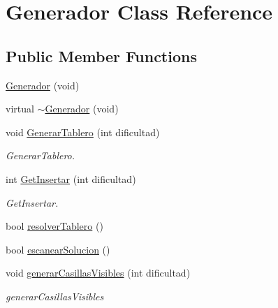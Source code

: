 \hypertarget{class_generador}{\section{Generador Class Reference}
\label{class_generador}
}
\subsection*{Public Member Functions}
\begin{DoxyCompactItemize}
\item 
\hyperlink{class_generador_a6b8606d04a21242daa5b7b0313ae8029}{Generador} (void)
\item 
virtual \hyperlink{class_generador_a088aa3e97fb0a1e13b168c362485e7c8}{$\sim$\-Generador} (void)
\item 
void \hyperlink{class_generador_ab67862d2f13c1e9b18b29b385bf5a20e}{Generar\-Tablero} (int dificultad)
\begin{DoxyCompactList}\small\item\em Generar\-Tablero. \end{DoxyCompactList}\item 
int \hyperlink{class_generador_a2c233f259d61ca15ca1130518ff44004}{Get\-Insertar} (int dificultad)
\begin{DoxyCompactList}\small\item\em Get\-Insertar. \end{DoxyCompactList}\item 
bool \hyperlink{class_generador_a430dccdbfe57088212912c30259f8757}{resolver\-Tablero} ()
\item 
bool \hyperlink{class_generador_a0e8bb058054de56ece51fc880a23fd07}{escanear\-Solucion} ()
\item 
void \hyperlink{class_generador_a07bf7d13a36ad3fd7c11355f5b84cde5}{generar\-Casillas\-Visibles} (int dificultad)
\begin{DoxyCompactList}\small\item\em generar\-Casillas\-Visibles \end{DoxyCompactList}\end{DoxyCompactItemize}
